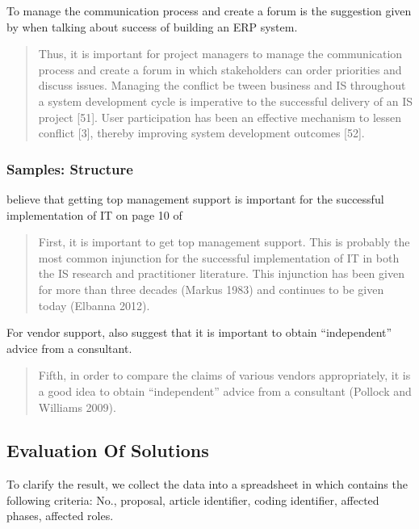 To manage the communication process and create a forum is the suggestion given by \citeauthor{2} when talking about success of building an ERP system.
\begin{quotation}
Thus, it is important for project managers to manage the communication process and create a forum in which stakeholders can order priorities and discuss issues. Managing the conflict be tween business and IS throughout a system development cycle is imperative to the successful delivery of an IS project [51]. User participation has been an effective mechanism to lessen conflict [3], thereby improving system development outcomes [52].
\end{quotation}


\subsubsection{Samples: Structure}
\citeauthor{6} believe that getting top management support is important for the successful implementation of IT on page 10 of 
\begin{quotation}
First, it is important to get top management support. This is probably the most common injunction for the successful implementation of IT in both the IS research and practitioner literature. This injunction has been given for more than three decades (Markus 1983) and continues to be given today (Elbanna 2012).
\end{quotation}

For vendor support, \citeauthor{6} also suggest that it is important to obtain “independent” advice from a consultant.
\begin{quotation}
Fifth, in order to compare the claims of various vendors appropriately, it is a good idea to obtain “independent” advice from a consultant (Pollock and Williams 2009).
\end{quotation}

\subsection{Evaluation Of Solutions}
\label{section:evaluation}
To clarify the result, we collect the data into a spreadsheet in which contains the following criteria: No., proposal, article identifier, coding identifier, affected phases, affected roles.

